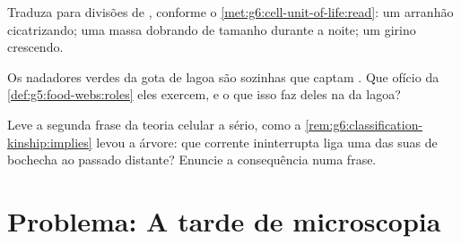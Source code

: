 \begin{exercise}[$\star\star$]\label{exo:g6:cell-unit-of-life:10}
Traduza para divisões de , conforme o
\cref{met:g6:cell-unit-of-life:read}: um arranhão cicatrizando; uma
massa dobrando de tamanho durante a noite; um girino crescendo.
\end{exercise}

\begin{exercise}[$\star\star$]\label{exo:g6:cell-unit-of-life:11}
Os nadadores verdes da gota de lagoa são  sozinhas que captam
. Que ofício da \cref{def:g5:food-webs:roles} eles exercem, e o que
isso faz deles na  da lagoa?
\end{exercise}

\begin{exercise}[$\star\star\star$]\label{exo:g6:cell-unit-of-life:12}
Leve a segunda frase da teoria celular a sério, como a
\cref{rem:g6:classification-kinship:implies} levou a árvore: que
corrente ininterrupta liga uma das suas  de bochecha ao passado
distante? Enuncie a consequência numa frase.
\end{exercise}

\section{Problema: A tarde de microscopia}

